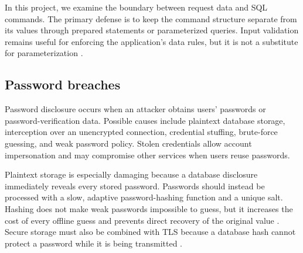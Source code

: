 In this project, we examine the boundary between request data and SQL commands. The primary defense is to keep the command structure separate from its values through prepared statements or parameterized queries. Input validation remains useful for enforcing the application's data rules, but it is not a substitute for parameterization \cite{OWASPSQLi}.

\subsection{Password breaches}
Password disclosure occurs when an attacker obtains users' passwords or password-verification data. Possible causes include plaintext database storage, interception over an unencrypted connection, credential stuffing, brute-force guessing, and weak password policy. Stolen credentials allow account impersonation and may compromise other services when users reuse passwords.

Plaintext storage is especially damaging because a database disclosure immediately reveals every stored password. Passwords should instead be processed with a slow, adaptive password-hashing function and a unique salt. Hashing does not make weak passwords impossible to guess, but it increases the cost of every offline guess and prevents direct recovery of the original value \cite{OWASPPassword}. Secure storage must also be combined with TLS because a database hash cannot protect a password while it is being transmitted \cite{OWASPTLS}.
